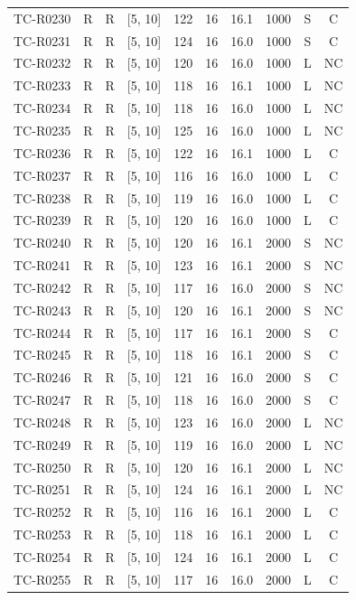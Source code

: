 \begin{longtable}{lccccccccc}
TC-R0230 & R & R & [5, 10] & 122 & 16 & 16.1 & 1000 & S & C \\
TC-R0231 & R & R & [5, 10] & 124 & 16 & 16.0 & 1000 & S & C \\
TC-R0232 & R & R & [5, 10] & 120 & 16 & 16.0 & 1000 & L & NC \\
TC-R0233 & R & R & [5, 10] & 118 & 16 & 16.1 & 1000 & L & NC \\
TC-R0234 & R & R & [5, 10] & 118 & 16 & 16.0 & 1000 & L & NC \\
TC-R0235 & R & R & [5, 10] & 125 & 16 & 16.0 & 1000 & L & NC \\
TC-R0236 & R & R & [5, 10] & 122 & 16 & 16.1 & 1000 & L & C \\
TC-R0237 & R & R & [5, 10] & 116 & 16 & 16.0 & 1000 & L & C \\
TC-R0238 & R & R & [5, 10] & 119 & 16 & 16.0 & 1000 & L & C \\
TC-R0239 & R & R & [5, 10] & 120 & 16 & 16.0 & 1000 & L & C \\
TC-R0240 & R & R & [5, 10] & 120 & 16 & 16.1 & 2000 & S & NC \\
TC-R0241 & R & R & [5, 10] & 123 & 16 & 16.1 & 2000 & S & NC \\
TC-R0242 & R & R & [5, 10] & 117 & 16 & 16.0 & 2000 & S & NC \\
TC-R0243 & R & R & [5, 10] & 120 & 16 & 16.1 & 2000 & S & NC \\
TC-R0244 & R & R & [5, 10] & 117 & 16 & 16.1 & 2000 & S & C \\
TC-R0245 & R & R & [5, 10] & 118 & 16 & 16.1 & 2000 & S & C \\
TC-R0246 & R & R & [5, 10] & 121 & 16 & 16.0 & 2000 & S & C \\
TC-R0247 & R & R & [5, 10] & 118 & 16 & 16.0 & 2000 & S & C \\
TC-R0248 & R & R & [5, 10] & 123 & 16 & 16.0 & 2000 & L & NC \\
TC-R0249 & R & R & [5, 10] & 119 & 16 & 16.0 & 2000 & L & NC \\
TC-R0250 & R & R & [5, 10] & 120 & 16 & 16.1 & 2000 & L & NC \\
TC-R0251 & R & R & [5, 10] & 124 & 16 & 16.1 & 2000 & L & NC \\
TC-R0252 & R & R & [5, 10] & 116 & 16 & 16.1 & 2000 & L & C \\
TC-R0253 & R & R & [5, 10] & 118 & 16 & 16.1 & 2000 & L & C \\
TC-R0254 & R & R & [5, 10] & 124 & 16 & 16.1 & 2000 & L & C \\
TC-R0255 & R & R & [5, 10] & 117 & 16 & 16.0 & 2000 & L & C \\

\end{longtable}

